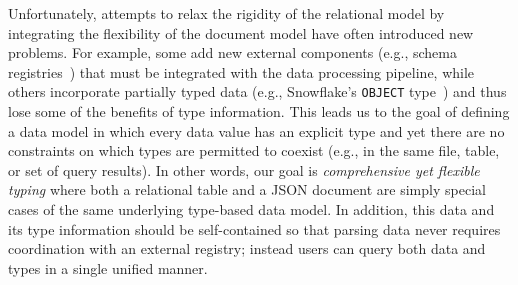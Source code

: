 Unfortunately, attempts to relax the rigidity of the relational model by integrating the flexibility of the document model have often introduced new problems. For example, some add new external components (e.g., schema registries~\cite{confluent_schema_registry}) that must be integrated with the data processing pipeline, while others incorporate partially typed data (e.g., Snowflake's \texttt{OBJECT} type~\cite{snowflake}) and thus lose some of the benefits of type information.
This leads us to the goal of defining a data model in which every data value has an explicit type and yet there are no constraints on which types are permitted to coexist (e.g., in the same file, table, or set of query results). In other words, our goal is {\em comprehensive yet flexible typing} where both a relational table and a JSON document are simply special cases of the same underlying type-based data model.
In addition, this data and its type information should be self-contained so that parsing data never requires coordination with an external registry; instead users can query both data and types in a single unified manner.

